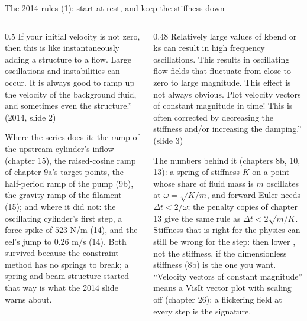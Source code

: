 \documentclass[aspectratio=169,11pt]{beamer}
\begin{document}
\begin{frame}{The 2014 rules (1): start at rest, and keep the stiffness down}
\label{fr:ramp}
\begin{columns}[T,onlytextwidth]
\begin{column}{0.5\textwidth}
\footnotesize {} If your initial velocity is not zero, then this is like instantaneously adding a structure to a flow. Large oscillations and instabilities can occur. It is always good to ramp up the velocity of the background fluid, and sometimes even the structure.'' (2014, slide 2)
\vspace{1mm}

\scriptsize Where the series does it: the  ramp of the upstream cylinder's inflow (chapter 15), the raised-cosine ramp of chapter 9a's target points, the half-period ramp of the pump (9b), the gravity ramp  of the filament (15); and where it did not: the oscillating cylinder's first step, a force spike of $523$ N/m (14), and the eel's jump to $0.26$ m/s (14). Both survived because the constraint method has no springs to break; a spring-and-beam structure started that way is what the 2014 slide warns about.
\end{column}
\begin{column}{0.48\textwidth}
\footnotesize {} Relatively large values of kbend or ks can result in high frequency oscillations. This results in oscillating flow fields that fluctuate from close to zero to large magnitude. This effect is not always obvious. Plot velocity vectors of constant magnitude in time! This is often corrected by decreasing the stiffness and/or increasing the damping.'' (slide 3)
\vspace{1mm}

\scriptsize The numbers behind it (chapters 8b, 10, 13): a spring of stiffness $K$ on a point whose share of fluid mass is $m$ oscillates at $\omega = \sqrt{K/m}$, and forward Euler needs $\Delta t < 2/\omega$; the penalty copies of chapter 13 give the same rule as $\Delta t < 2\sqrt{m/K}$. Stiffness that is right for the physics can still be wrong for the step: then lower , not the stiffness, if the dimensionless stiffness (8b) is the one you want. ``Velocity vectors of constant magnitude'' means a VisIt vector plot with scaling off (chapter 26): a flickering field at every step is the signature.
\end{column}
\end{columns}
\end{frame}
\end{document}
